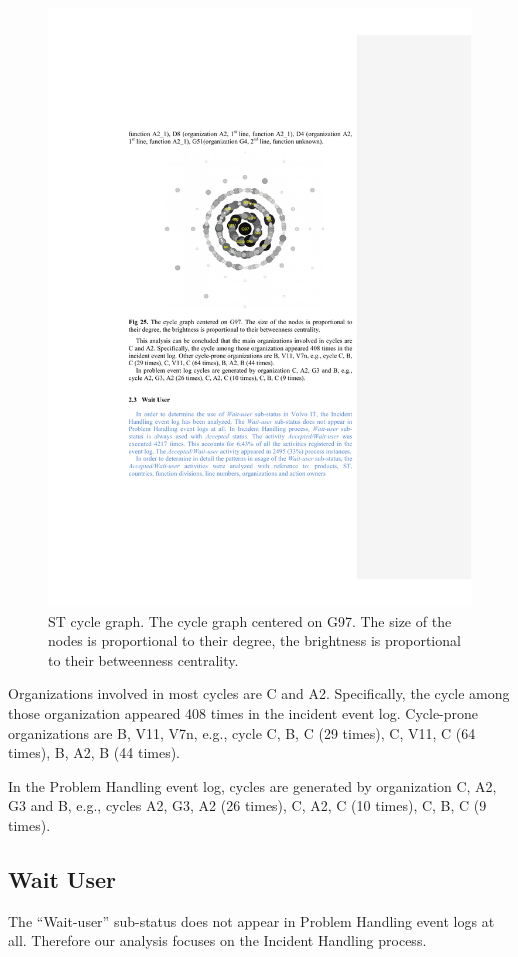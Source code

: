 \documentclass[lnbip]{svmultln}
\begin{document}
\begin{figure}
  \begin{center}
    \includegraphics[width=.7\textwidth]{"figs/pic 27"}
  \end{center}
  \caption{ST cycle graph. The cycle graph centered on G97. The size of the nodes is proportional to their degree, the brightness is proportional to their betweenness centrality.}
  \label{fig:cycleGraphG97}
\end{figure}

Organizations involved in most cycles are C and A2. Specifically, the cycle among those organization appeared 408 times in the incident event log. Cycle-prone organizations are B, V11, V7n, e.g., cycle C, B, C (29 times), C, V11, C (64 times), B, A2, B (44 times).

In the Problem Handling event log, cycles are generated by organization C, A2, G3 and B, e.g., cycles A2, G3, A2 (26 times), C, A2, C (10 times), C, B, C (9 times).

\subsection{Wait User}
The ``Wait-user'' sub-status does not appear in Problem Handling event logs at all. Therefore our analysis focuses on the Incident Handling process.
\end{document}
